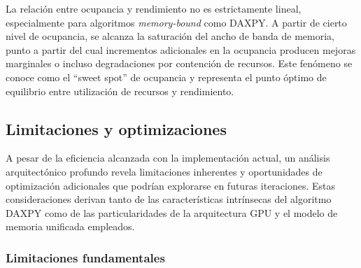         La relación entre ocupancia y rendimiento no es estrictamente lineal, especialmente para algoritmos \textit{memory-bound} como DAXPY. A partir de cierto nivel de ocupancia, se alcanza la saturación del ancho de banda de memoria, punto a partir del cual incrementos adicionales en la ocupancia producen mejoras marginales o incluso degradaciones por contención de recursos. Este fenómeno se conoce como el ``sweet spot'' de ocupancia y representa el punto óptimo de equilibrio entre utilización de recursos y rendimiento.
    
    \subsection{Limitaciones y optimizaciones}
    
        A pesar de la eficiencia alcanzada con la implementación actual, un análisis arquitectónico profundo revela limitaciones inherentes y oportunidades de optimización adicionales que podrían explorarse en futuras iteraciones. Estas consideraciones derivan tanto de las características intrínsecas del algoritmo DAXPY como de las particularidades de la arquitectura GPU y el modelo de memoria unificada empleados.
        
        \subsubsection{Limitaciones fundamentales}
    
